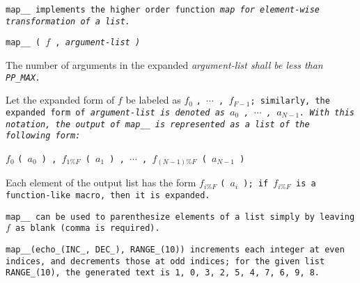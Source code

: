 \tt{map__} implements the higher order function
\it{map} for element-wise transformation of a list.


\tt{map__ (} $f$ \tt{,} \it{argument-list} \tt{)}


The number of arguments in the expanded
\it{argument-list} shall be less than \tt{PP_MAX}.


Let the expanded form of $f$ be labeled as $f_0$ \tt{,} $\cdots$ \tt{,} $f_{F-1}$;
similarly, the expanded form of \it{argument-list}
is denoted as $a_0$ \tt{,} $\cdots$ \tt{,} $a_{N-1}$.
With this notation, the output of \tt{map__}
is represented as a list of the following form:

\centerline
{
$f_0$ \tt{(} $a_0$ \tt{) ,}
$f_{1\%F}$ \tt{(} $a_1$ \tt{) ,}
$\cdots$ \tt{,}
$f_{(N - 1)\%F}$ \tt{(} $a_{N - 1}$ \tt{)}
}

Each element of the output list has the form $f_{i\%F}$ \tt{(} $a_i$ \tt{)};
if $f_{i\%F}$ is a function-like macro, then it is expanded.

\note \tt{map__} can be used to parenthesize elements of
a list simply by leaving $f$ as blank (comma is required).

\example \tt{map__(echo_(INC_, DEC_), RANGE_(10))} increments each integer
at even indices, and decrements those at odd indices; for the given list
\tt{RANGE_(10)}, the generated text is \tt{1, 0, 3, 2, 5, 4, 7, 6, 9, 8}.
